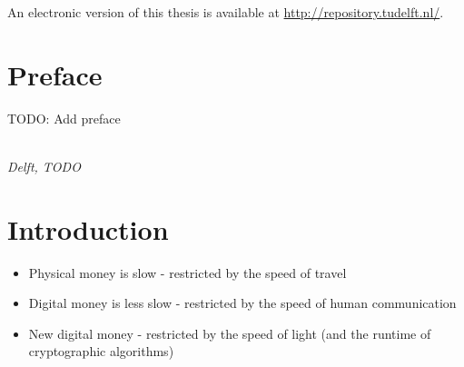 \documentclass[whitelogo]{tudelft-report}
\providecommand{\tightlist}{%
  \setlength{\itemsep}{0pt}\setlength{\parskip}{0pt}}
\begin{document}
\begin{titlepage}
\begin{center}
\bigskip
\bigskip
An electronic version of this thesis is available at \url{http://repository.tudelft.nl/}.



\end{center}


\end{titlepage}

\chapter*{Preface}

TODO: Add preface

\begin{flushright}
{\makeatletter\itshape
    \@author \\
    Delft, TODO
\makeatother}
\end{flushright}


\tableofcontents

\mainmatter

\chapter{Introduction}\label{introduction}

\begin{itemize}
\tightlist
\item
  Physical money is slow - restricted by the speed of travel
\item
  Digital money is less slow - restricted by the speed of human
  communication
\item
  New digital money - restricted by the speed of light (and the runtime
  of cryptographic algorithms)
\end{itemize}
\end{document}
